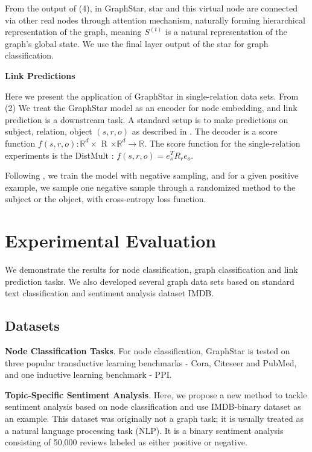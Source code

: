 \documentclass{article}
\begin{document}
From the output of (4), in GraphStar, star and this virtual node are connected via other real nodes through attention mechanism, naturally forming hierarchical representation of the graph, meaning \(S^(t)\) is a natural representation of the graph's global state. We use the final layer output of the star for graph classification.

\textbf{Link Predictions}

Here we present the application of GraphStar in single-relation data sets. From (2) We treat the GraphStar model as an encoder for node embedding, and link prediction is a downstream task. A standard setup is to make predictions on subject, relation, object \((s,r,o)\) as described in \cite{schlichtkrull2018modeling}. The decoder is a score function  \(f(s,r,o):\mathbb{R}^d \times\) R \(\times \mathbb{R}^d \rightarrow \mathbb{R}\). The score function for the single-relation experiments is the DistMult \cite{yang2014embedding}: \(f(s,r,o)=e_s^TR_re_o\).

Following  \cite{yang2014embedding, trouillon2016complex,schlichtkrull2018modeling}, we train the model with negative sampling, and for a given positive example, we sample one negative sample through a randomized method to the subject or the object, with cross-entropy loss function.

\section{Experimental Evaluation}

We demonstrate the results for node classification, graph classification and link prediction tasks. We also developed several graph data sets based on standard text classification and sentiment analysis dataset IMDB. 

\subsection{Datasets}

\textbf{Node Classification Tasks}. For node classification, GraphStar is tested on three popular transductive learning benchmarks - Cora, Citeseer and PubMed, and one inductive learning benchmark - PPI.

\textbf{Topic-Specific Sentiment Analysis}. Here, we propose a new method to tackle sentiment analysis based on node classification and use IMDB-binary dataset as an example. This dataset was originally not a graph task; it is usually treated as a natural language processing task (NLP). It is a binary sentiment analysis consisting of 50,000 reviews labeled as either positive or negative. 
\end{document}
